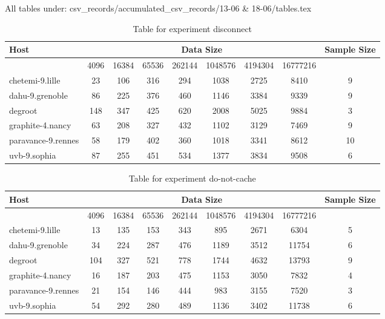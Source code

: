 All tables under: csv_records/accumulated_csv_records/13-06 & 18-06/tables.tex
\begin{table}
\caption{Table for experiment disconnect}
\begin{tabular}{@{}lcccccccc@{}}
\toprule
Host    & \multicolumn{7}{c}{Data Size}          & Sample Size \\ \midrule
& 4096  & 16384  & 65536  & 262144  & 1048576  & 4194304  & 16777216              \\ \midrule
chetemi-9.lille  & 23  & 106  & 316  & 294  & 1038  & 2725  & 8410  & 9 \\
dahu-9.grenoble  & 86  & 225  & 376  & 460  & 1146  & 3384  & 9339  & 9 \\
degroot  & 148  & 347  & 425  & 620  & 2008  & 5025  & 9884  & 3 \\
graphite-4.nancy  & 63  & 208  & 327  & 432  & 1102  & 3129  & 7469  & 9 \\
paravance-9.rennes  & 58  & 179  & 402  & 360  & 1018  & 3341  & 8612  & 10 \\
uvb-9.sophia  & 87  & 255  & 451  & 534  & 1377  & 3834  & 9508  & 6 \\
\bottomrule
\end{tabular}
\end{table}

\begin{table}
\caption{Table for experiment do-not-cache}
\begin{tabular}{@{}lcccccccc@{}}
\toprule
Host    & \multicolumn{7}{c}{Data Size}          & Sample Size \\ \midrule
& 4096  & 16384  & 65536  & 262144  & 1048576  & 4194304  & 16777216              \\ \midrule
chetemi-9.lille  & 13  & 135  & 153  & 343  & 895  & 2671  & 6304  & 5 \\
dahu-9.grenoble  & 34  & 224  & 287  & 476  & 1189  & 3512  & 11754  & 6 \\
degroot  & 104  & 327  & 521  & 778  & 1744  & 4632  & 13793  & 9 \\
graphite-4.nancy  & 16  & 187  & 203  & 475  & 1153  & 3050  & 7832  & 4 \\
paravance-9.rennes  & 21  & 154  & 146  & 444  & 983  & 3155  & 7520  & 3 \\
uvb-9.sophia  & 54  & 292  & 280  & 489  & 1136  & 3402  & 11738  & 6 \\
\bottomrule
\end{tabular}
\end{table}

